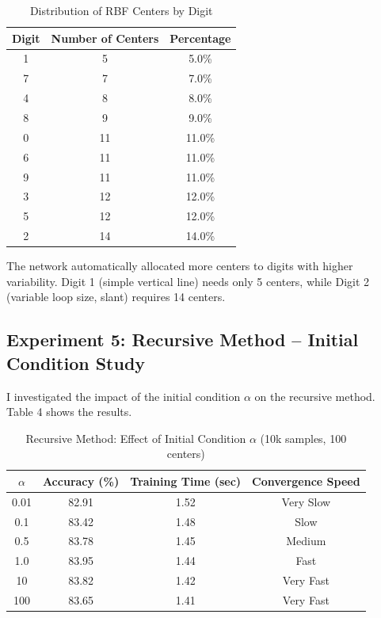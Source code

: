 \documentclass[12pt]{article}
\begin{document}
	\begin{table}[H]
		\centering
		\caption{Distribution of RBF Centers by Digit}
		\begin{tabular}{ccc}
			\toprule
			\textbf{Digit} & \textbf{Number of Centers} & \textbf{Percentage} \\
			\midrule
			1 & 5 & 5.0\% \\
			7 & 7 & 7.0\% \\
			4 & 8 & 8.0\% \\
			8 & 9 & 9.0\% \\
			0 & 11 & 11.0\% \\
			6 & 11 & 11.0\% \\
			9 & 11 & 11.0\% \\
			3 & 12 & 12.0\% \\
			5 & 12 & 12.0\% \\
			2 & 14 & 14.0\% \\
			\bottomrule
		\end{tabular}
	\end{table}
	
	The network automatically allocated more centers to digits with higher variability. Digit 1 (simple vertical line) needs only 5 centers, while Digit 2 (variable loop size, slant) requires 14 centers.
	
	\subsection{Experiment 5: Recursive Method – Initial Condition Study}
	
	I investigated the impact of the initial condition $\alpha$ on the recursive method. Table 4 shows the results.
	
	\begin{table}[H]
		\centering
		\caption{Recursive Method: Effect of Initial Condition $\alpha$ (10k samples, 100 centers)}
		\begin{tabular}{cccc}
			\toprule
			$\alpha$ & \textbf{Accuracy (\%)} & \textbf{Training Time (sec)} & \textbf{Convergence Speed} \\
			\midrule
			0.01 & 82.91 & 1.52 & Very Slow \\
			0.1 & 83.42 & 1.48 & Slow \\
			0.5 & 83.78 & 1.45 & Medium \\
			1.0 & 83.95 & 1.44 & Fast \\
			10 & 83.82 & 1.42 & Very Fast \\
			100 & 83.65 & 1.41 & Very Fast \\
			\bottomrule
		\end{tabular}
	\end{table}
	
\end{document}
